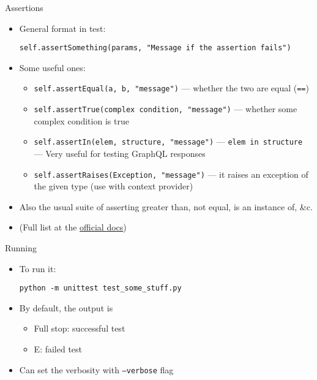 \documentclass[t]{beamer}
\newcommand{\code}[1]{\texttt{#1}}
\begin{document}
	\begin{frame}[fragile]{Assertions}
		\begin{itemize}
			\item General format in test: 

				\code{self.assertSomething(params, "Message if the assertion fails")}

			\item Some useful ones:
				\begin{itemize}
					\item \code{self.assertEqual(a, b, "message")} --- whether the two are equal (\code{==})
					\item \code{self.assertTrue(complex condition, "message")} --- whether some complex condition is true
					\item \code{self.assertIn(elem, structure, "message")} --- \code{elem in structure} --- Very useful for testing GraphQL responses
					\item \code{self.assertRaises(Exception, "message")} --- it raises an exception of the given type (use with context provider) 
				\end{itemize}
			\item Also the usual suite of asserting greater than, not equal, is an instance of, \&c.
			\item (Full list at the \href{https://docs.python.org/3/library/unittest.html#unittest.TestCase.assertEqual}{official docs})
		\end{itemize}
	\end{frame}

	\begin{frame}[fragile]{Running}
		\begin{itemize}
			\item To run it:

				\code{python -m unittest test\_some\_stuff.py}
			\item By default, the output is
				\begin{itemize}
					\item Full stop: successful test
					\item E: failed test
				\end{itemize}
			\item Can set the verbosity with \code{--verbose} flag
		\end{itemize}
	\end{frame}
\end{document}
